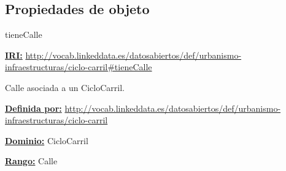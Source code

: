 \subsection{Propiedades de objeto}


\begin{mybox}{tieneCalle}
\begin{flushleft}
\underline{\textbf{IRI:}}
\url{http://vocab.linkeddata.es/datosabiertos/def/urbanismo-infraestructuras/ciclo-carril#tieneCalle}
\newline

Calle asociada a un CicloCarril.
\newline

\underline{\textbf{Definida por:}}
\url{http://vocab.linkeddata.es/datosabiertos/def/urbanismo-infraestructuras/ciclo-carril}
\newline

\underline{\textbf{Dominio:}}
		CicloCarril
\newline

\underline{\textbf{Rango:}}
		Calle
\newline


\end{flushleft}
\end{mybox}



